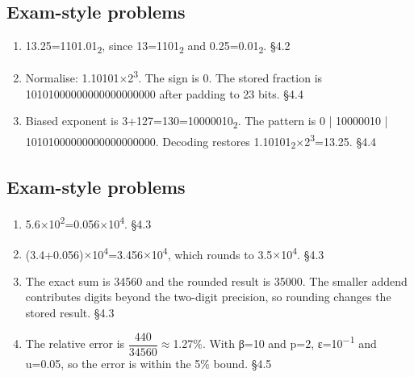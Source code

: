 \documentclass[11pt]{article}
\begin{document}
\begin{keepsection}\subsection{Exam-style problems}

\begin{enumerate}
\item 13.25=1101.01\textsubscript{2}, since 13=1101\textsubscript{2} and 0.25=0.01\textsubscript{2}. \hfill{\small\color{FAUblue}§4.2}
\item Normalise: 1.10101\ensuremath{\times}2\textsuperscript{3}. The sign is 0. The stored fraction is 10101000000000000000000 after padding to 23 bits. \hfill{\small\color{FAUblue}§4.4}
\item Biased exponent is 3+127=130=10000010\textsubscript{2}. The pattern is 0 | 10000010 | 10101000000000000000000. Decoding restores 1.10101\textsubscript{2}\ensuremath{\times}2\textsuperscript{3}=13.25. \hfill{\small\color{FAUblue}§4.4}
\end{enumerate}

\end{keepsection}
\begin{keepsection}\subsection{Exam-style problems}

\begin{enumerate}
\item 5.6\ensuremath{\times}10\textsuperscript{2}=0.056\ensuremath{\times}10\textsuperscript{4}. \hfill{\small\color{FAUblue}§4.3}
\item (3.4+0.056)\ensuremath{\times}10\textsuperscript{4}=3.456\ensuremath{\times}10\textsuperscript{4}, which rounds to 3.5\ensuremath{\times}10\textsuperscript{4}. \hfill{\small\color{FAUblue}§4.3}
\item The exact sum is 34560 and the rounded result is 35000. The smaller addend contributes digits beyond the two-digit precision, so rounding changes the stored result. \hfill{\small\color{FAUblue}§4.3}
\item The relative error is {\small\ensuremath{\dfrac{440}{34560}}}\ensuremath{\approx}1.27\%. With β=10 and p=2, ε=10\textsuperscript{\ensuremath{-}1} and u=0.05, so the error is within the 5\% bound. \hfill{\small\color{FAUblue}§4.5}
\end{enumerate}

\end{keepsection}
\end{document}
